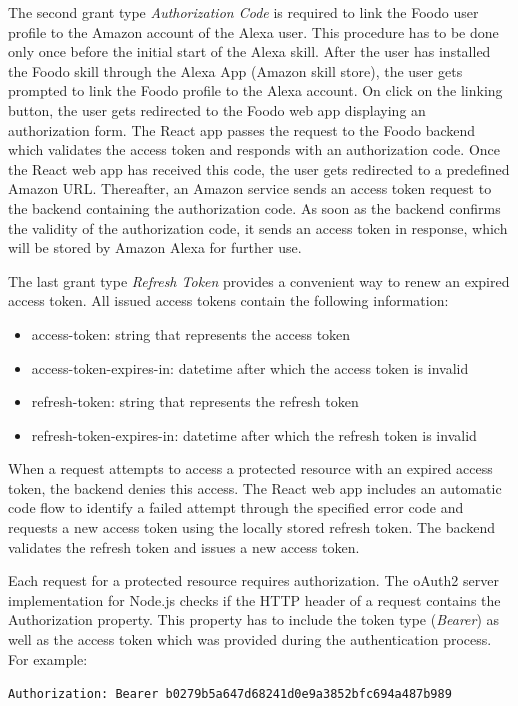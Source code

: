 The second grant type \textit{Authorization Code} is required to link the Foodo user profile to the Amazon account of the Alexa user. This procedure has to be done only once before the initial start of the Alexa skill. After the user has installed the Foodo skill through the Alexa App (Amazon skill store), the user gets prompted to link the Foodo profile to the Alexa account. On click on the linking button, the user gets redirected to the Foodo web app displaying an authorization form. The React app passes the request to the Foodo backend which validates the access token and responds with an authorization code. Once the React web app has received this code, the user gets redirected to a predefined Amazon URL. Thereafter, an Amazon service sends an access token request to the backend containing the authorization code. As soon as the backend confirms the validity of the authorization code, it sends an access token in response, which will be stored by Amazon Alexa for further use. 

The last grant type \textit{Refresh Token} provides a convenient way to renew an expired access token. All issued access tokens contain the following information:
\vspace{-1em}
\begin{itemize}
	\itemsep-0.5em
	\item access-token: string that represents the access token
	\item access-token-expires-in: datetime after which the access token is invalid
	\item refresh-token: string that represents the refresh token
	\item refresh-token-expires-in: datetime after which the refresh token is invalid
\end{itemize}


When a request attempts to access a protected resource with an expired access token, the backend denies this access. The React web app includes an automatic code flow to identify a failed attempt through the specified error code and requests a new access token using the locally stored refresh token. The backend validates the refresh token and issues a new access token.


Each request for a protected resource requires authorization. The oAuth2 server implementation for Node.js checks if the HTTP header of a request contains the Authorization property. This property has to include the token type (\textit{Bearer}) as well as the access token which was provided during the authentication process. For example: \vspace{-1.5em}
\begin{center}
	\texttt{Authorization: Bearer b0279b5a647d68241d0e9a3852bfc694a487b989}
\end{center}

